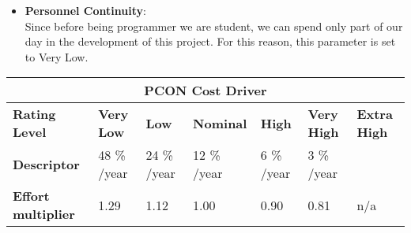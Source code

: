 \begin{itemize}
\item \textbf{Personnel Continuity}:\\
Since before being programmer we are student, we can spend only part of our day in the development of this project. For this reason, this parameter is set to Very Low.
\end{itemize}
\hspace*{-3cm}\begin{tabular}{|p{3cm}|p{2cm}|p{2cm}|p{2cm}|p{2cm}|p{2cm}|p{2cm}|}
\hline
\multicolumn{7}{|c|}{\textbf{PCON Cost Driver}}\\
\hline
\hline
\textbf{Rating Level} & \textbf{Very Low} & \textbf{Low} & \textbf{Nominal} & \textbf{High} & \textbf{Very High} & \textbf{Extra High}\\
\hline
\textbf{Descriptor} & 48 \% /year  & 24 \% /year & 12 \% /year & 6 \% /year & 3 \% /year & \\
\hline
\textbf{Effort multiplier} & 1.29 & 1.12 & 1.00 & 0.90 & 0.81 & n/a\\
\hline 
\end{tabular}
